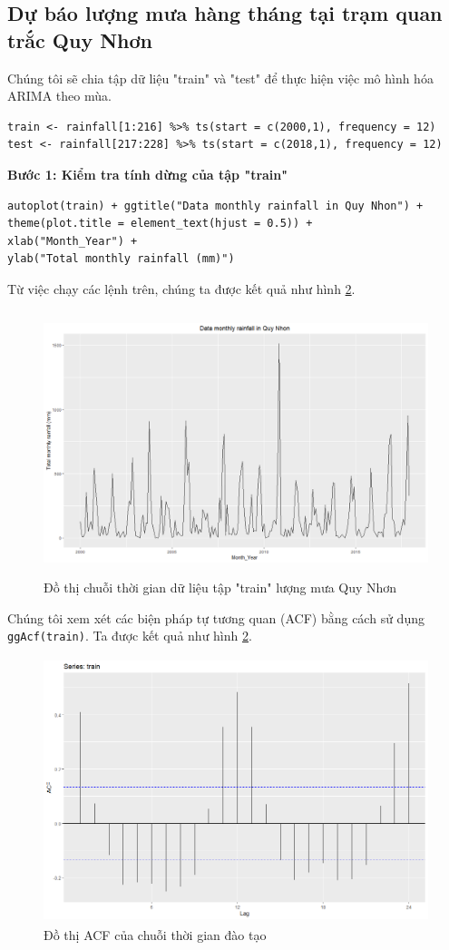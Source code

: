 \documentclass[12pt, a4paper,oneside]{book}
\theoremstyle{definition}
\begin{document}
\subsection{\label{lmqn}Dự báo lượng mưa hàng tháng tại trạm quan trắc Quy Nhơn}
Chúng tôi sẽ chia tập dữ  liệu "train" và "test" để thực hiện việc mô hình hóa ARIMA theo mùa.\\
\begin{lstlisting}
train <- rainfall[1:216] %>% ts(start = c(2000,1), frequency = 12)
test <- rainfall[217:228] %>% ts(start = c(2018,1), frequency = 12)
\end{lstlisting}
\textbf{Bước 1: Kiểm tra tính dừng của tập "train"}\\
\begin{lstlisting}
autoplot(train) + ggtitle("Data monthly rainfall in Quy Nhon") + 
theme(plot.title = element_text(hjust = 0.5)) + 
xlab("Month_Year") +
ylab("Total monthly rainfall (mm)")
\end{lstlisting}
Từ việc chạy các lệnh trên, chúng ta được kết quả như hình \ref{V5}.
\begin{figure}[!htb]
	\centering
	\includegraphics[width=1\linewidth,height=7.7cm]{anh/V5}
	\vskip-4mm 
	\caption{Đồ thị chuỗi thời gian dữ liệu tập "train" lượng mưa Quy Nhơn}  
	\label{V1}
\end{figure}
Chúng tôi xem xét các biện pháp tự tương quan (ACF) bằng cách sử dụng \lstinline{ggAcf(train)}. Ta được kết quả như hình \ref{V5}.
\begin{figure}[!htb]
	\centering
	\includegraphics[width=1\linewidth,height=7.7cm]{anh/acfrainfall}
	\vskip-4mm 
	\caption{Đồ thị ACF của chuỗi thời gian đào tạo}  
	\label{V5}
\end{figure}
\end{document}
